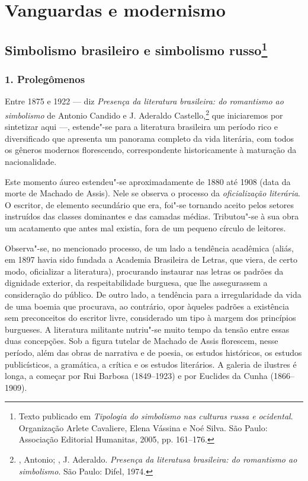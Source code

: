 \part{Vanguardas e modernismo}

\chapter{Simbolismo brasileiro e simbolismo russo\footnote{Texto
  publicado em \emph{Tipologia do simbolismo nas culturas russa e
  ocidental}. Organização Arlete Cavaliere, Elena Vássina e Noé Silva.
  São Paulo: Associação Editorial Humanitas, 2005, pp. 161--176.}}

\section{1. Prolegômenos}

Entre 1875 e 1922 --- diz \emph{Presença da literatura brasileira: do
romantismo ao simbolismo} de Antonio Candido e J. Aderaldo
Castello,\footnote{, Antonio; , J. Aderaldo.
  \emph{Presença da literatusa brasileira: do romantismo ao simbolismo}.
  São Paulo: Difel, 1974.} que iniciaremos por sintetizar aqui ---,
estende"-se para a literatura brasileira um período rico e diversificado
que apresenta um panorama completo da vida literária, com todos os
gêneros modernos florescendo, correspondente historicamente à maturação
da nacionalidade.

Este momento áureo estendeu"-se aproximadamente de 1880 até 1908 (data da
morte de Machado de Assis). Nele se observa o processo da
\emph{oficialização literária}. O escritor, de elemento secundário que
era, foi"-se tornando aceito pelos setores instruídos das classes
dominantes e das camadas médias. Tributou"-se à sua obra um acatamento
que antes mal existia, fora de um pequeno círculo de leitores.

Observa"-se, no mencionado processo, de um lado a tendência acadêmica
(aliás, em 1897 havia sido fundada a Academia Brasileira de Letras, que
viera, de certo modo, oficializar a literatura), procurando instaurar
nas letras os padrões da dignidade exterior, da respeitabilidade
burguesa, que lhe assegurassem a consideração do público. De outro lado,
a tendência para a irregularidade da vida de uma boemia que procurava,
ao contrário, opor àqueles padrões a existência sem preconceitos do
escritor livre, considerado um tipo à margem dos princípios burgueses. A
literatura militante nutriu"-se muito tempo da tensão entre essas duas
concepções. Sob a figura tutelar de Machado de Assis florescem, nesse
período, além das obras de narrativa e de poesia, os estudos históricos,
os estudos publicísticos, a gramática, a crítica e os estudos literários. A galeria de ilustres é longa, a começar por Rui Barbosa (1849--1923) e por Euclides da Cunha (1866--1909).


